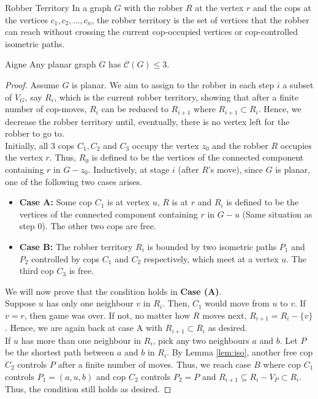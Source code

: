 \documentclass[12pt, a4paper]{article}
\begin{document}
\begin{definition}{Robber Territory}{}
    In a graph $G$ with the robber $R$ at the vertex $r$ and the cops at the vertices $c_1, c_2, \dots, c_n$, the robber territory is the set of vertices that the robber can reach without crossing the current cop-occupied vertices or cop-controlled isometric paths.
\end{definition}

\begin{theorem}{}{Aigne}
    Any planar graph $G$ has $\mathcal{C}(G) \leq 3$.
\end{theorem}

\begin{proof}
Assume $G$ is planar. We aim to assign to the robber in each step $i$ a subset of $V_G$, say $R_i$, which is the current robber territory, showing that after a finite number of cop-moves, $R_i$ can be reduced to $R_{i+1}$ where $R_{i+1} \subset R_i$. Hence, we decrease the robber territory until, eventually, there is no vertex left for the robber to go to.\\
Initially, all 3 cops $C_1,C_2$ and $C_3$ occupy the vertex $z_0$ and the robber $R$ occupies the vertex $r$. Thus, $R_0$ is defined to be the vertices of the connected component containing $r$ in $G - z_0$. Inductively, at stage $i$ (after $R$'s move), since $G$ is planar, one of the following two cases arises.
\begin{itemize}
    \item \textbf{Case A:} Some cop $C_1$ is at vertex $u$, $R$ is at $r$ and $R_i$ is defined to be the vertices of the connected component containing $r$ in $G - u$ (Same situation as step 0). The other two cops are free.
    \item \textbf{Case B:} The robber territory $R_i$ is bounded by two isometric paths $P_1$ and $P_2$ controlled by cops $C_1$ and $C_2$ respectively, which meet at a vertex $u$. The third cop $C_3$ is free.
\end{itemize}

We will now prove that the condition holds in \textbf{Case (A)}.\\
Suppose $u$ has only one neighbour $v$ in $R_i$. Then, $C_1$ would move from $u$ to $v$. If $v = r$, then game was over. If not, no matter how $R$ moves next, $R_{i + 1} = R_i - \{v\}$. Hence, we are again back at case A with $R_{i + 1} \subset R_i$ as desired.\\
If $u$ has more than one neighbour in $R_i$, pick any two neighbours $a$ and $b$. Let $P$ be the shortest path between $a$ and $b$ in $R_i$. By Lemma \ref{lem:iso}, another free cop $C_2$ controls $P$ after a finite number of moves. Thus, we reach case $B$ where cop $C_1$ controls $P_1 = (a, u, b)$ and cop $C_2$ controls $P_2 = P$ and $R_{i + 1} \subseteq R_i - V_P \subset R_i$. Thus, the condition still holds as desired.


\end{proof}
\end{document}
